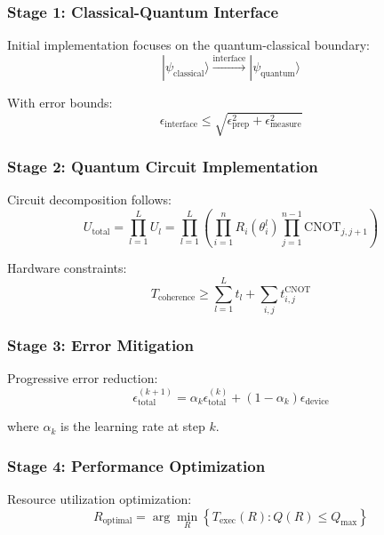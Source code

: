 \documentclass{article}
\begin{document}
\subsubsection{Stage 1: Classical-Quantum Interface}
Initial implementation focuses on the quantum-classical boundary:
\begin{equation}
|\psi_{\text{classical}}\rangle \xrightarrow{\text{interface}} |\psi_{\text{quantum}}\rangle
\end{equation}

With error bounds:
\begin{equation}
\epsilon_{\text{interface}} \leq \sqrt{\epsilon_{\text{prep}}^2 + \epsilon_{\text{measure}}^2}
\end{equation}

\subsubsection{Stage 2: Quantum Circuit Implementation}
Circuit decomposition follows:
\begin{equation}
U_{\text{total}} = \prod_{l=1}^L U_l = \prod_{l=1}^L \left(\prod_{i=1}^n R_i(\theta_i^l) \prod_{j=1}^{n-1} \text{CNOT}_{j,j+1}\right)
\end{equation}

Hardware constraints:
\begin{equation}
T_{\text{coherence}} \geq \sum_{l=1}^L t_l + \sum_{i,j} t_{i,j}^{\text{CNOT}}
\end{equation}

\subsubsection{Stage 3: Error Mitigation}
Progressive error reduction:
\begin{equation}
\epsilon_{\text{total}}^{(k+1)} = \alpha_k \epsilon_{\text{total}}^{(k)} + (1-\alpha_k)\epsilon_{\text{device}}
\end{equation}

where $\alpha_k$ is the learning rate at step $k$.

\subsubsection{Stage 4: Performance Optimization}
Resource utilization optimization:
\begin{equation}
R_{\text{optimal}} = \arg\min_R \left\{T_{\text{exec}}(R) : Q(R) \leq Q_{\text{max}}\right\}
\end{equation}
\end{document}
